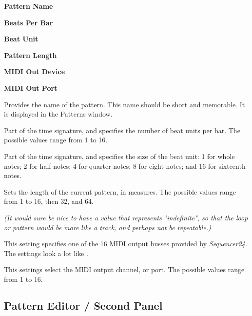    \begin{enumber}
      \item \textbf{Pattern Name}
      \item \textbf{Beats Per Bar}
      \item \textbf{Beat Unit}
      \item \textbf{Pattern Length}
      \item \textbf{MIDI Out Device}
      \item \textbf{MIDI Out Port}
   \end{enumber}

   \setcounter{ItemCounter}{0}      %

   Provides the name of the pattern.
   This name should be short and memorable.
   It is displayed in the Patterns window.

   Part of the time signature, and specifies the number of beat units per bar.
   The possible values range from 1 to 16.

   Part of the time signature, and specifies the size of the beat unit:
   1 for whole notes; 2 for half notes; 4 for quarter notes; 8 for eight notes;
   and 16 for sixteenth notes.

   Sets the length of the current pattern, in measures.
   The possible values range from 1 to 16, then 32, and 64.

   \textsl{(It would sure be nice to have a value that represents
   "indefinite", so that the loop or pattern would be more like a track,
   and perhaps not be repeatable.)}

   This setting specifies one of the 16 MIDI output busses provided by
   \textsl{Sequencer24}.  The settings look a lot like
   .

   This settings select the MIDI output channel, or port.
   The possible values range from 1 to 16.

\subsection{Pattern Editor / Second Panel}
\label{subsec:seq24_pattern_editor_second}

